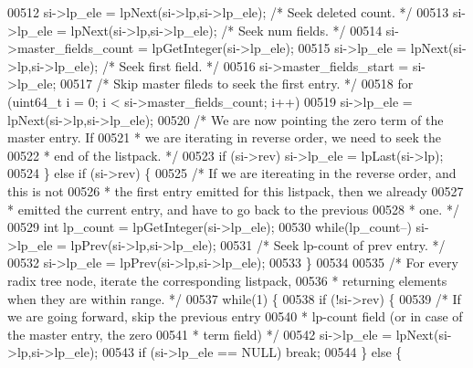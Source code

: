\begin{DoxyCode}
{00512             si->lp\_ele = lpNext(si->lp,si->lp\_ele); \textcolor{comment}{/* Seek deleted count. */}
00513             si->lp\_ele = lpNext(si->lp,si->lp\_ele); \textcolor{comment}{/* Seek num fields. */}
00514             si->master\_fields\_count = lpGetInteger(si->lp\_ele);
00515             si->lp\_ele = lpNext(si->lp,si->lp\_ele); \textcolor{comment}{/* Seek first field. */}
00516             si->master\_fields\_start = si->lp\_ele;
00517             \textcolor{comment}{/* Skip master fileds to seek the first entry. */}
00518             \textcolor{keywordflow}{for} (uint64\_t i = 0; i < si->master\_fields\_count; i++)
00519                 si->lp\_ele = lpNext(si->lp,si->lp\_ele);
00520             \textcolor{comment}{/* We are now pointing the zero term of the master entry. If}
00521 \textcolor{comment}{             * we are iterating in reverse order, we need to seek the}
00522 \textcolor{comment}{             * end of the listpack. */}
00523             \textcolor{keywordflow}{if} (si->rev) si->lp\_ele = lpLast(si->lp);
00524         \} \textcolor{keywordflow}{else} \textcolor{keywordflow}{if} (si->rev) \{
00525             \textcolor{comment}{/* If we are itereating in the reverse order, and this is not}
00526 \textcolor{comment}{             * the first entry emitted for this listpack, then we already}
00527 \textcolor{comment}{             * emitted the current entry, and have to go back to the previous}
00528 \textcolor{comment}{             * one. */}
00529             \textcolor{keywordtype}{int} lp\_count = lpGetInteger(si->lp\_ele);
00530             \textcolor{keywordflow}{while}(lp\_count--) si->lp\_ele = lpPrev(si->lp,si->lp\_ele);
00531             \textcolor{comment}{/* Seek lp-count of prev entry. */}
00532             si->lp\_ele = lpPrev(si->lp,si->lp\_ele);
00533         \}
00534 
00535         \textcolor{comment}{/* For every radix tree node, iterate the corresponding listpack,}
00536 \textcolor{comment}{         * returning elements when they are within range. */}
00537         \textcolor{keywordflow}{while}(1) \{
00538             \textcolor{keywordflow}{if} (!si->rev) \{
00539                 \textcolor{comment}{/* If we are going forward, skip the previous entry}
00540 \textcolor{comment}{                 * lp-count field (or in case of the master entry, the zero}
00541 \textcolor{comment}{                 * term field) */}
00542                 si->lp\_ele = lpNext(si->lp,si->lp\_ele);
00543                 \textcolor{keywordflow}{if} (si->lp\_ele == NULL) \textcolor{keywordflow}{break};
00544             \} \textcolor{keywordflow}{else} \{
}
\end{DoxyCode}
